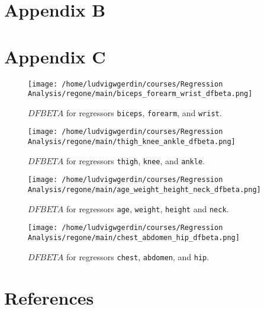 \documentclass[11pt]{article}
\begin{document}
\newpage

\section{Appendix B}
\label{sec:org2c82b23}
\section{Appendix C}
\label{sec:orga908813}

\begin{figure}[H]
\centering
\texttt{[image: /home/ludvigwgerdin/courses/Regression Analysis/regone/main/biceps\_forearm\_wrist\_dfbeta.png]}
\caption{\label{fig:org6a675ee}
\(DFBETA\) for regressors \texttt{biceps}, \texttt{forearm}, and \texttt{wrist}.}
\end{figure}

\begin{figure}[H]
\centering
\texttt{[image: /home/ludvigwgerdin/courses/Regression Analysis/regone/main/thigh\_knee\_ankle\_dfbeta.png]}
\caption{\label{fig:org6ba0bbd}
\(DFBETA\) for regressors \texttt{thigh}, \texttt{knee}, and \texttt{ankle}.}
\end{figure}

\begin{figure}[H]
\centering
\texttt{[image: /home/ludvigwgerdin/courses/Regression Analysis/regone/main/age\_weight\_height\_neck\_dfbeta.png]}
\caption{\label{fig:org5677687}
\(DFBETA\) for regressors \texttt{age}, \texttt{weight}, \texttt{height} and \texttt{neck}.}
\end{figure}

\begin{figure}[H]
\centering
\texttt{[image: /home/ludvigwgerdin/courses/Regression Analysis/regone/main/chest\_abdomen\_hip\_dfbeta.png]}
\caption{\label{fig:org5aa1ab7}
\(DFBETA\) for regressors \texttt{chest}, \texttt{abdomen}, and \texttt{hip}.}
\end{figure}

\newpage

\section{References}
\label{sec:orgd857a6a}



\end{document}
